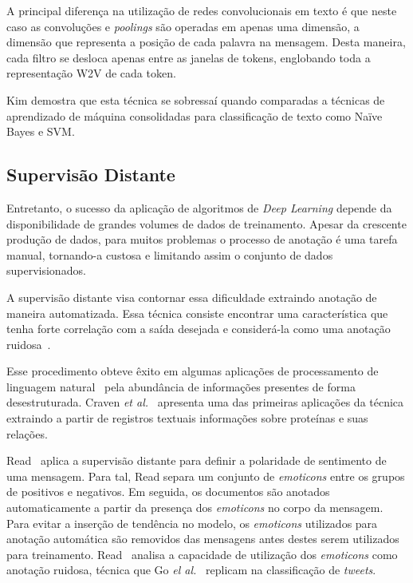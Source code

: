 A principal diferença na utilização de redes convolucionais em texto é que neste caso as convoluções e \textit{poolings}
são operadas em apenas uma dimensão, a dimensão que representa a posição de cada palavra na mensagem.
Desta maneira, cada filtro se desloca apenas entre as janelas de tokens, englobando toda a representação W2V de cada
token.

Kim demostra que esta técnica se sobressaí quando comparadas a técnicas de aprendizado de máquina consolidadas para
classificação de texto como Naïve Bayes e SVM.

\subsection{Supervisão Distante}\label{distant_supervision}

Entretanto, o sucesso da aplicação de algoritmos de \textit{Deep Learning} depende da disponibilidade de grandes volumes
de dados de treinamento.
Apesar da crescente produção de dados, para muitos problemas o processo de anotação é uma tarefa manual, tornando-a
custosa e limitando assim o conjunto de dados supervisionados.

A supervisão distante visa contornar essa dificuldade extraindo anotação de maneira automatizada.
Essa técnica consiste encontrar uma característica que tenha forte correlação com a saída desejada e considerá-la como
uma anotação ruidosa~\cite{go09}.

Esse procedimento obteve êxito em algumas aplicações de processamento de linguagem natural~\cite{craven99}\cite{go09}
pela abundância de informações presentes de forma desestruturada.
Craven \textit{et al.}~\cite{craven99} apresenta uma das primeiras aplicações da técnica extraindo a partir de registros
textuais informações sobre proteínas e suas relações.

Read~\cite{read05} aplica a supervisão distante para definir a polaridade de sentimento de uma mensagem.
Para tal, Read separa um conjunto de \textit{emoticons} entre os grupos de positivos e negativos.
Em seguida, os documentos são anotados automaticamente a partir da presença dos \textit{emoticons} no corpo da mensagem.
Para evitar a inserção de tendência no modelo, os \textit{emoticons} utilizados para anotação automática são removidos
das mensagens antes destes serem utilizados para treinamento.
Read~\cite{read05} analisa a capacidade de utilização dos \textit{emoticons} como anotação ruidosa, técnica que Go
\textit{el al.}~\cite{go09} replicam na classificação de \textit{tweets}.
